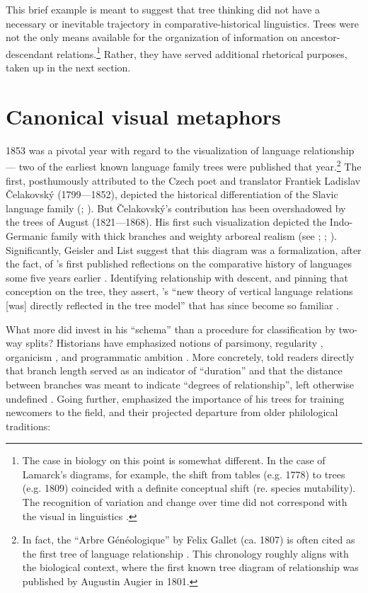 \documentclass[output=paper]{langscibook}
\begin{document}
This brief example is meant to suggest that tree thinking did not have a necessary or inevitable trajectory in comparative-historical linguistics. Trees were not the only means available for the organization of information on ancestor-descendant relations.\footnote{The case in biology on this point is somewhat different. In the case of Lamarck's diagrams, for example, the shift from tables (e.g. 1778) to trees (e.g. 1809) coincided with a definite conceptual shift (re. species mutability). The recognition of variation and change over time did not correspond with the visual in linguistics \citep[chap. 3]{Archibald2014}.} Rather, they have served additional rhetorical purposes, taken up in the next section.

\section{Canonical visual metaphors}
\label{sec:kaplan:visualmetaphors}

1853 was a pivotal year with regard to the visualization of language relationship — two of the earliest known language family trees were published that year.\footnote{In fact, the ``Arbre Généologique'' by Felix Gallet (ca. 1807) is often cited as the first tree of language relationship \citep[242]{Hellstrom2012}. This chronology roughly aligns with the biological context, where the first known tree diagram of relationship was published by Augustin Augier in 1801.} The first, posthumously attributed to the Czech poet and translator Frantiek Ladislav Čelakovský (1799—1852), depicted the historical differentiation of the Slavic language family (\citealt[3]{Czelakovsky1853}; \citealt{Priestly1975}). But Čelakovský's contribution has been overshadowed by the trees of August {\Schleicher} (1821—1868). His first such visualization depicted the Indo-Germanic family with thick branches and weighty arboreal realism (see \citealt{Maher1966}; \citealt{Hoenigswald1975}; \citealt{Koerner1987}). Significantly, Geisler and List suggest that this diagram was a formalization, after the fact, of {\Schleicher}'s first published reflections on the comparative history of languages some five years earlier \citep{Schleicher1848}. Identifying relationship with descent, and pinning that conception on the tree, they assert, {\Schleicher}'s ``new theory of vertical language relations [was] directly reflected in the tree model'' that has since become so familiar \citep[114]{GeislerList2013}.

What more did {\Schleicher} invest in his ``schema'' than a procedure for classification by two-way splits? Historians have emphasized notions of parsimony, regularity \citep[117, 114--115]{GeislerList2013}, organicism \citep[56]{Wells1987}, and programmatic ambition \citep[755]{Koerner1975}. More concretely, {\Schleicher} told readers directly that branch length served as an indicator of ``duration'' and that the distance between branches was meant to indicate ``degrees of relationship'', left otherwise undefined \citep[8]{Schleicher1853}. Going further, {\Schleicher} emphasized the importance of his trees for training newcomers to the field, and their projected departure from older philological traditions:
\end{document}
